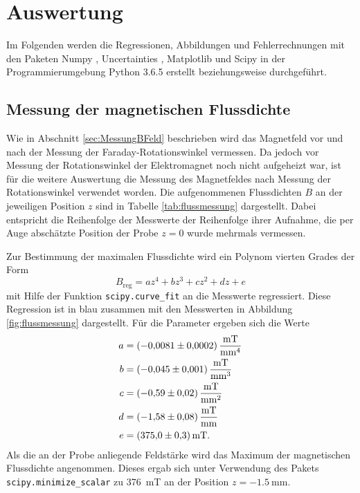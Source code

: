 \newpage
\section{Auswertung}
\label{sec:Auswertung}

Im Folgenden werden die Regressionen, Abbildungen und Fehlerrechnungen mit den
Paketen Numpy \cite{numpy}, Uncertainties \cite{uncertainties}, Matplotlib
\cite{matplotlib} und Scipy \cite{scipy} in der Programmierumgebung
Python 3.6.5 erstellt beziehungsweise durchgeführt.

\subsection{Messung der magnetischen Flussdichte}
\label{sec:flussmessung}

Wie in Abschnitt \ref{sec:MessungBFeld} beschrieben wird das Magnetfeld
vor und nach der Messung der Faraday-Rotationswinkel vermessen.
Da jedoch vor Messung der Rotationswinkel der Elektromagnet noch nicht
aufgeheizt war, ist für die weitere Auswertung die Messung des Magnetfeldes
nach Messung der Rotationswinkel verwendet worden.
Die aufgenommenen Flussdichten $B$ an der jeweiligen Position $z$
sind in Tabelle \ref{tab:flussmessung} dargestellt.
Dabei entspricht die Reihenfolge der Messwerte der Reihenfolge ihrer
Aufnahme, die per Auge abschätzte Position der Probe $z = 0$ wurde
mehrmals vermessen.



Zur Bestimmung der maximalen Flussdichte wird ein Polynom vierten Grades
der Form
\begin{equation}
  B_\text{reg} = a z^4 + b z^3 + c z^2 + d z + e
  \label{eqn:feldfit}
\end{equation}
mit Hilfe der Funktion \texttt{scipy.curve\_fit} an die Messwerte regressiert.
Diese Regression ist in blau zusammen mit den Messwerten in Abbildung
\ref{fig:flussmessung} dargestellt. Für die Parameter ergeben sich die Werte
\begin{align*}
  a &= \SI{-0.0081(2)}{\milli\tesla\per\raiseto{4}\milli\meter} \\
  b &= \SI{-0.045(1)}{\milli\tesla\per\raiseto{3}\milli\meter} \\
  c &= \SI{-0.59(2)}{\milli\tesla\per\raiseto{2}\milli\meter} \\
  d &= \SI{-1.58(8)}{\milli\tesla\per\raiseto{1}\milli\meter} \\
  e &= \SI{375.0(3)}{\milli\tesla}.
\end{align*}
Als die an der Probe anliegende Feldstärke wird das Maximum der magnetischen
Flussdichte angenommen. Dieses ergab sich unter Verwendung des Pakets
\texttt{scipy.minimize\_scalar} zu
\SI{376}{\milli\tesla} an der Position $z = \SI{-1.5}{\milli\meter}$.


